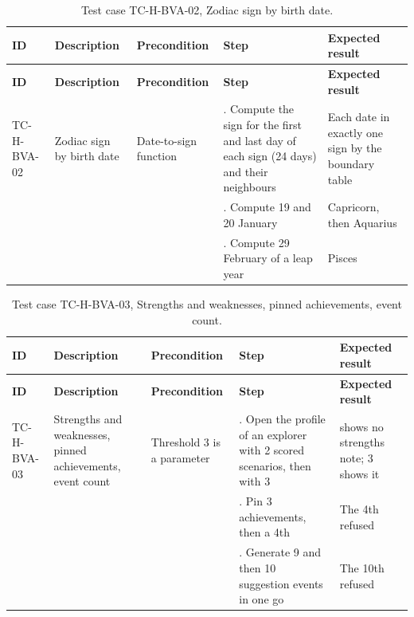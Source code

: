 {\small
\begin{longtable}{|>{\raggedright\arraybackslash}p{}|>{\raggedright\arraybackslash}p{}|>{\raggedright\arraybackslash}p{}|>{\raggedright\arraybackslash}p{}|>{\raggedright\arraybackslash}p{}|}
\caption{Test case TC-H-BVA-02, Zodiac sign by birth date.} \\
\hline
\textbf{ID} & \textbf{Description} & \textbf{Precondition} & \textbf{Step} & \textbf{Expected result} \\ \hline
\endfirsthead
\hline
\textbf{ID} & \textbf{Description} & \textbf{Precondition} & \textbf{Step} & \textbf{Expected result} \\ \hline
\endhead
TC-H-BVA-02 & Zodiac sign by birth date & Date-to-sign function & 1. Compute the sign for the first and last day of each sign (24 days) and their neighbours & Each date in exactly one sign by the boundary table \\ \hline
 &  &  & 2. Compute 19 and 20 January & Capricorn, then Aquarius \\ \hline
 &  &  & 3. Compute 29 February of a leap year & Pisces \\ \hline
\end{longtable}
}

{\small
\begin{longtable}{|>{\raggedright\arraybackslash}p{}|>{\raggedright\arraybackslash}p{}|>{\raggedright\arraybackslash}p{}|>{\raggedright\arraybackslash}p{}|>{\raggedright\arraybackslash}p{}|}
\caption{Test case TC-H-BVA-03, Strengths and weaknesses, pinned achievements, event count.} \\
\hline
\textbf{ID} & \textbf{Description} & \textbf{Precondition} & \textbf{Step} & \textbf{Expected result} \\ \hline
\endfirsthead
\hline
\textbf{ID} & \textbf{Description} & \textbf{Precondition} & \textbf{Step} & \textbf{Expected result} \\ \hline
\endhead
TC-H-BVA-03 & Strengths and weaknesses, pinned achievements, event count & Threshold 3 is a parameter & 1. Open the profile of an explorer with 2 scored scenarios, then with 3 & 2 shows no strengths note; 3 shows it \\ \hline
 &  &  & 2. Pin 3 achievements, then a 4th & The 4th refused \\ \hline
 &  &  & 3. Generate 9 and then 10 suggestion events in one go & The 10th refused \\ \hline
\end{longtable}
}

